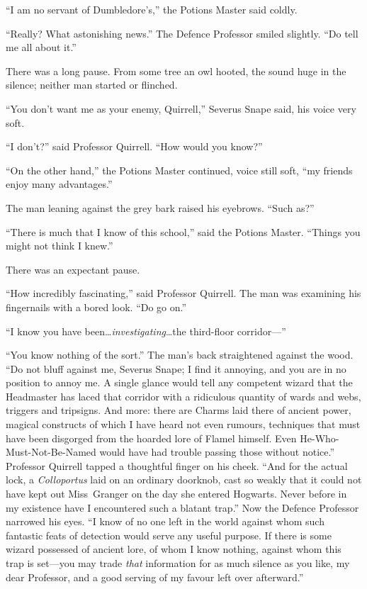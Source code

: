 “I am no servant of Dumbledore’s,” the Potions Master said coldly.

“Really? What astonishing news.” The Defence Professor smiled slightly. “Do
tell me all about it.”

There was a long pause. From some tree an owl hooted, the sound huge in the
silence; neither man started or flinched.

“You don’t want me as your enemy, Quirrell,” Severus Snape said, his voice very
soft.

“I don’t?” said Professor Quirrell. “How would you know?”

“On the other hand,” the Potions Master continued, voice still soft, “my
friends enjoy many advantages.”

The man leaning against the grey bark raised his eyebrows. “Such as?”

“There is much that I know of this school,” said the Potions Master. “Things
you might not think I knew.”

There was an expectant pause.

“How incredibly fascinating,” said Professor Quirrell. The man was examining
his fingernails with a bored look. “Do go on.”

“I know you have been…\emph{investigating}…the third-floor corridor—”

“You know nothing of the sort.” The man’s back straightened against the wood.
“Do not bluff against me, Severus Snape; I find it annoying, and you are in no
position to annoy me. A single glance would tell any competent wizard that the
Headmaster has laced that corridor with a ridiculous quantity of wards and
webs, triggers and tripsigns. And more: there are Charms laid there of ancient
power, magical constructs of which I have heard not even rumours, techniques
that must have been disgorged from the hoarded lore of Flamel himself. Even
He-Who-Must-Not-Be-Named would have had trouble passing those without notice.”
Professor Quirrell tapped a thoughtful finger on his cheek. “And for the actual
lock, a \emph{Colloportus} laid on an ordinary doorknob, cast so weakly that it
could not have kept out Miss~Granger on the day she entered Hogwarts. Never
before in my existence have I encountered such a blatant trap.” Now the Defence
Professor narrowed his eyes. “I know of no one left in the world against whom
such fantastic feats of detection would serve any useful purpose. If there is
some wizard possessed of ancient lore, of whom I know nothing, against whom
this trap is set—you may trade \emph{that} information for as much silence as
you like, my dear Professor, and a good serving of my favour left over
afterward.”

